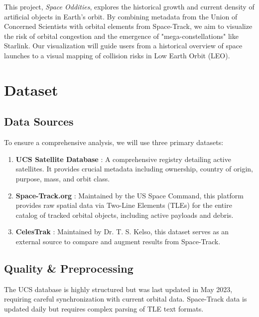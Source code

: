 \begin{summary}
    This project, \textit{Space Oddities}, explores the historical growth and current density of artificial objects in Earth's orbit. By combining metadata from the Union of Concerned Scientists with orbital elements from Space-Track, we aim to visualize the risk of orbital congestion and the emergence of "mega-constellations" like Starlink. Our visualization will guide users from a historical overview of space launches to a visual mapping of collision risks in Low Earth Orbit (LEO).
\end{summary}

\section{Dataset}

\subsection{Data Sources}
To ensure a comprehensive analysis, we will use three primary datasets:
\begin{enumerate}
    \item \textbf{UCS Satellite Database} \cite{ucs-database}: A comprehensive registry detailing active satellites. It provides crucial metadata including ownership, country of origin, purpose, mass, and orbit class.
    \item \textbf{Space-Track.org} \cite{space-track}: Maintained by the US Space Command, this platform provides raw spatial data via Two-Line Elements (TLEs) for the entire catalog of tracked orbital objects, including active payloads and debris.
    \item \textbf{CelesTrak} \cite{celestrak}: Maintained by Dr. T. S. Kelso, this dataset serves as an external source to compare and augment results from Space-Track.
\end{enumerate}


\subsection{Quality \& Preprocessing}
The UCS database is highly structured but was last updated in May 2023, requiring careful synchronization with current orbital data. Space-Track data is updated daily but requires complex parsing of TLE text formats.

